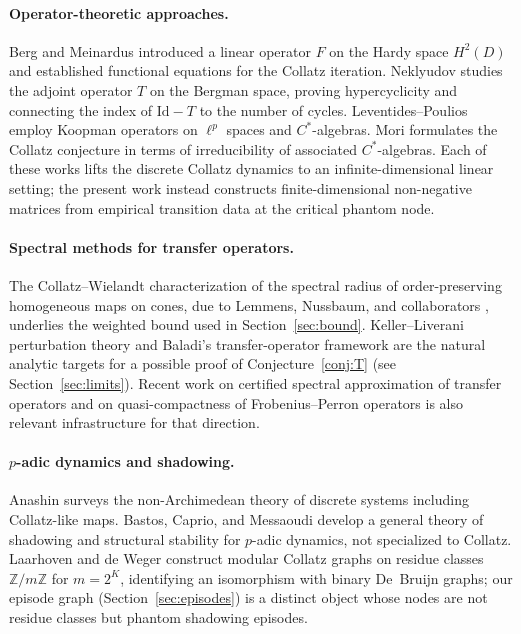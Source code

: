 \documentclass[11pt,a4paper]{article}
\theoremstyle{definition}
\newcommand{\Z}{\mathbb{Z}}
\begin{document}
\paragraph{Operator-theoretic approaches.}
Berg and Meinardus \cite{berg1996} introduced a linear operator
$F$ on the Hardy space $H^2(D)$ and established functional
equations for the Collatz iteration. Neklyudov
\cite{neklyudov2022} studies the adjoint operator $T$ on the
Bergman space, proving hypercyclicity and connecting the index of
$\mathrm{Id}-T$ to the number of cycles. Leventides--Poulios
\cite{leventides2020} employ Koopman operators on $\ell^p$ spaces
and $C^*$-algebras. Mori \cite{mori2025} formulates the Collatz
conjecture in terms of irreducibility of associated $C^*$-algebras.
Each of these works lifts the discrete Collatz dynamics to an
infinite-dimensional linear setting; the present work instead
constructs finite-dimensional non-negative matrices from empirical
transition data at the critical phantom node.

\paragraph{Spectral methods for transfer operators.}
The Collatz--Wielandt characterization of the spectral radius of
order-preserving homogeneous maps on cones, due to Lemmens,
Nussbaum, and collaborators \cite{lemmensnussbaum,akiangaubert},
underlies the weighted bound used in
Section~\ref{sec:bound}. Keller--Liverani perturbation theory
\cite{kellerliverani} and Baladi's transfer-operator framework
\cite{baladi} are the natural analytic targets for a possible
proof of Conjecture~\ref{conj:T} (see
Section~\ref{sec:limits}). Recent work on certified spectral
approximation of transfer operators \cite{certifiedspectral} and on
quasi-compactness of Frobenius--Perron operators
\cite{quasicompact} is also relevant infrastructure for that
direction.

\paragraph{$p$-adic dynamics and shadowing.}
Anashin \cite{anashin} surveys the non-Archimedean theory of
discrete systems including Collatz-like maps. Bastos, Caprio, and
Messaoudi \cite{bcm2020} develop a general theory of shadowing
and structural stability for $p$-adic dynamics, not specialized to
Collatz. Laarhoven and de Weger \cite{laarhoven2012} construct
modular Collatz graphs on residue classes $\Z / m \Z$ for
$m = 2^K$, identifying an isomorphism with binary De~Bruijn graphs;
our episode graph (Section~\ref{sec:episodes}) is a distinct object
whose nodes are not residue classes but phantom shadowing episodes.
\end{document}
